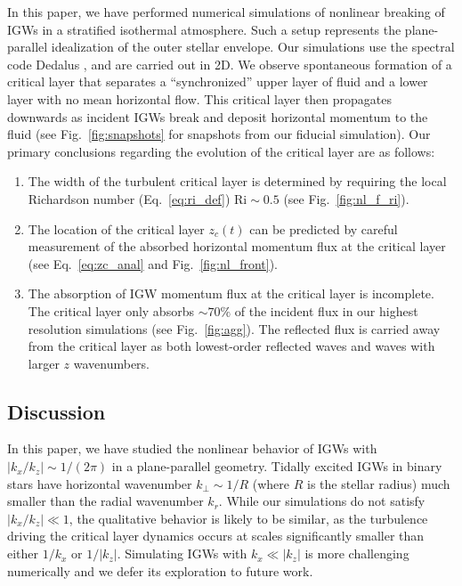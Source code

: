 \documentclass[
        fleqn,
        usenatbib,
    ]{mnras}
\newcommand*{\abs}[1]{\left|#1\right|}
\begin{document}
In this paper, we have performed numerical simulations of nonlinear breaking of
IGWs in a stratified isothermal atmosphere. Such a setup represents the
plane-parallel idealization of the outer stellar envelope. Our simulations use
the spectral code Dedalus \citep{dedalus,dedalus2}, and are carried out in 2D.
We observe spontaneous formation of a critical layer that separates a
``synchronized'' upper layer of fluid and a lower layer with no mean
horizontal flow. This critical layer then propagates downwards as incident IGWs
break and deposit horizontal momentum to the fluid (see Fig.~\ref{fig:snapshots}
for snapshots from our fiducial simulation). Our primary conclusions regarding
the evolution of the critical layer are as follows:
\begin{enumerate}
    \item The width of the turbulent critical layer is determined by requiring
        the local Richardson number (Eq.~\eqref{eq:ri_def}) $\mathrm{Ri} \sim
        0.5$ (see Fig.~\ref{fig:nl_f_ri}).

    \item The location of the critical layer $z_c(t)$ can be predicted by
        careful measurement of the absorbed horizontal momentum flux at the
        critical layer (see Eq.~\eqref{eq:zc_anal} and
        Fig.~\ref{fig:nl_front}).

    \item The absorption of IGW momentum flux at the critical layer is
        incomplete. The critical layer only absorbs $\sim 70\%$ of the incident
        flux in our highest resolution simulations (see Fig.~\ref{fig:agg}). The
        reflected flux is carried away from the critical layer as both
        lowest-order reflected waves and waves with larger $z$ wavenumbers.
\end{enumerate}

\subsection{Discussion}

In this paper, we have studied the nonlinear behavior of IGWs with $\abs{k_x /
k_z} \sim 1 / (2\pi)$ in a plane-parallel geometry. Tidally excited IGWs in
binary stars have horizontal wavenumber $k_\perp \sim 1/R$ (where $R$ is the
stellar radius) much smaller than the radial wavenumber $k_r$. While our
simulations do not satisfy $\abs{k_x/k_z}\ll 1$, the qualitative behavior is likely
to be similar, as the turbulence driving the critical layer dynamics occurs at
scales significantly smaller than either $1/k_x$ or $1/\abs{k_z}$. Simulating
IGWs with $k_x \ll \abs{k_z}$ is more challenging numerically and we defer its
exploration to future work.
\end{document}
